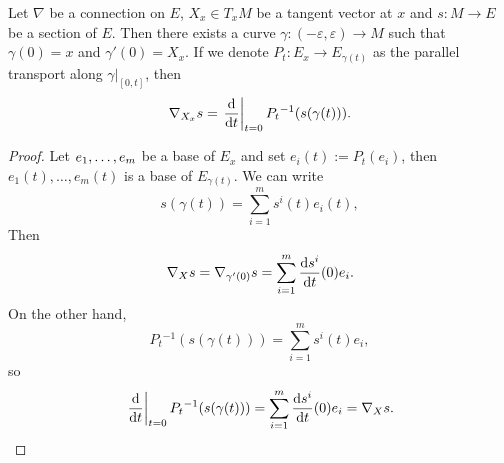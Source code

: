 \begin{proposition}
    Let $\nabla$ be a connection on $E$, $X_{x}\in T_xM$ be a tangent vector at $x$ 
    and $s:M\to E$ be a section of $E$. Then there exists a curve $\gamma: (-\varepsilon,\varepsilon) \to M$ such that $\gamma(0) = x$ and $\gamma'(0) = X_x$. 
    If we denote $P_t: E_x \to E_{\gamma(t)}$ as the parallel transport along $\gamma|_{[0,t]}$, then 
    \begin{equation}\label{eq:con-def-by-para}
        \nabla_{X_x} s = \left.\frac{{\rm d} }{{\rm d} t}\right|_{t=0} P_t{}^{-1}(s(\gamma(t))).
    \end{equation}
\end{proposition}
\begin{proof}
    Let ${e}_{1},\dots,{e}_{m}$ be a base of $E_x$ and set $e_i(t) := P_t(e_i)$, then $e_1(t),\ldots,e_m(t)$ is a base of $E_{\gamma(t)}$. 
    We can write 
    \begin{equation*}
        s(\gamma(t)) = \sum_{i=1}^m s^i(t) e_i(t),
    \end{equation*}
    Then 
    \begin{equation*}
        \nabla_X s = \nabla_{\gamma'(0)} s = \sum_{i=1}^m \frac{{\rm d} s^i}{{\rm d} t}(0) e_i.
    \end{equation*}
    On the other hand, 
    \begin{equation*}
        P_t{}^{-1}(s(\gamma(t))) = \sum_{i=1}^m s^i(t) e_i,
    \end{equation*}
    so
    \begin{equation*}
        \left.\frac{{\rm d} }{{\rm d} t}\right|_{t=0} P_t{}^{-1}(s(\gamma(t))) = \sum_{i=1}^m \frac{{\rm d} s^i}{{\rm d} t}(0) e_i = \nabla_X s. \qedhere
    \end{equation*}
\end{proof}


